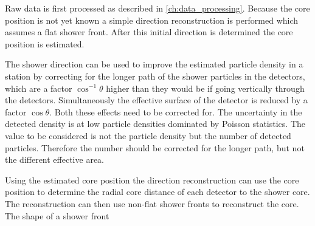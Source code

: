 Raw data is first processed as described in \cref{ch:data_processing}. Because the core position is not yet known a simple direction reconstruction is performed which assumes a flat shower front. After this initial direction is determined the core position is estimated.

The shower direction can be used to improve the estimated particle density in a station by correcting for the longer path of the shower particles in the detectors, which are a factor $\cos^{-1} \theta$ higher than they would be if going vertically through the detectors. Simultaneously the effective surface of the detector is reduced by a factor $\cos \theta$. Both these effects need to be corrected for. The uncertainty in the detected density is at low particle densities dominated by Poisson statistics. The value to be considered is not the particle density but the number of detected particles. Therefore the number should be corrected for the longer path, but not the different effective area.

Using the estimated core position the direction reconstruction can use the core position to determine the radial core distance of each detector to the shower core. The reconstruction can then use non-flat shower fronts to reconstruct the core. The shape of a shower front
